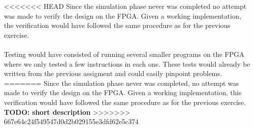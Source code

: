 <<<<<<< HEAD
Since the simulation phase never was completed no attempt was made to verify the design on the FPGA. Given a working implementation, the verification would have followed the same procedure as for the previous exercise. 
\\
\\
Testing would have consisted of running several smaller programs on the FPGA where we only tested a few instructions in each one. These tests would already be written from the previous assigment and could easily pinpoint problems.
=======
Since the simulation phase never was completed, no attempt was made to verify
the design on the FPGA. Given a working implementation, this verification would
have followed the same procedure as for the previous exercise.
\textbf{TODO: short description}
>>>>>>> 667e64c24f549547d0d2b029155e3dfd62e5c374
